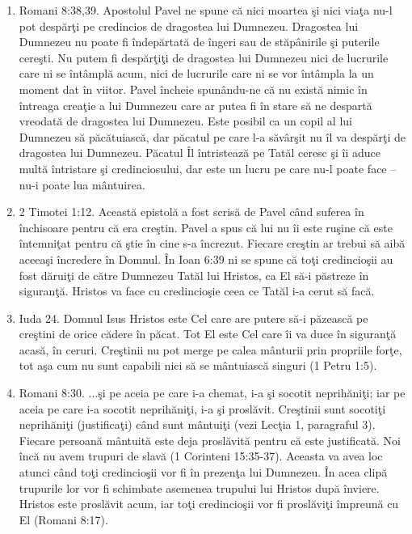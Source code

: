 \begin{enumerate}
	\item Romani 8:38,39. Apostolul Pavel ne spune că nici moartea şi nici viaţa nu-l pot despărţi pe credincios de dragostea lui Dumnezeu. Dragostea lui Dumnezeu nu poate fi îndepărtată de îngeri sau de stăpânirile şi puterile cereşti. Nu putem fi despărţiţi de dragostea lui Dumnezeu nici de lucrurile care ni se întâmplă acum, nici de lucrurile care ni se vor întâmpla la un moment dat în viitor. Pavel încheie spunându-ne că nu există nimic în întreaga creaţie a lui Dumnezeu care ar putea fi în stare să ne despartă vreodată de dragostea lui Dumnezeu. Este posibil ca un copil al lui Dumnezeu să păcătuiască, dar păcatul pe care l-a săvârşit nu îl va despărţi de dragostea lui Dumnezeu. Păcatul Îl întristează pe Tatăl ceresc şi îi aduce multă întristare şi credinciosului, dar este un lucru pe care nu-l poate face – nu-i poate lua mântuirea. 
	
	\item 2 Timotei 1:12. Această epistolă a fost scrisă de Pavel când suferea în închisoare pentru că era creştin. Pavel a spus că lui nu îi este ruşine că este întemniţat pentru că ştie în cine s-a încrezut. Fiecare creştin ar trebui să aibă aceeaşi încredere în Domnul. În Ioan 6:39 ni se spune că toţi credincioşii au fost dăruiţi de către Dumnezeu Tatăl lui Hristos, ca El să-i păstreze în siguranţă. Hristos va face cu credincioşie ceea ce Tatăl i-a cerut să facă.
	
	\item Iuda 24. Domnul Isus Hristos este Cel care are putere să-i păzească pe creştini de orice cădere în păcat. Tot El este Cel care îi va duce în siguranţă acasă, în ceruri. Creştinii nu pot merge pe calea mânturii prin propriile forţe, tot aşa cum nu sunt capabili nici să se mântuiască singuri (1 Petru 1:5).
	
	\item Romani 8:30. ...şi pe aceia pe care i-a chemat, i-a şi socotit neprihăniţi; iar pe aceia pe care i-a socotit neprihăniţi, i-a şi proslăvit. Creştinii sunt socotiţi neprihăniţi (justificaţi) când sunt mântuiţi (vezi Lecţia 1, paragraful 3). Fiecare persoană mântuită este deja proslăvită pentru că este justificată. Noi încă nu avem trupuri de slavă (1 Corinteni 15:35-37). Aceasta va avea loc atunci când toţi credincioşii vor fi în prezenţa lui Dumnezeu. În acea clipă trupurile lor vor fi schimbate asemenea trupului lui Hristos după înviere. Hristos este proslăvit acum, iar toţi credincioşii vor fi proslăviţi împreună cu El (Romani 8:17).
	
\end{enumerate}



